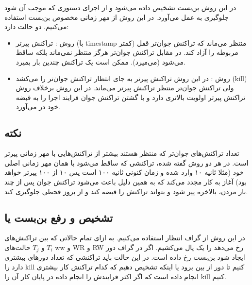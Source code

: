 در این روش بن‌بست تشخیص داده می‌شود و از اجرای دستوری که موجب آن شود جلوگیری به
عمل می‌آورد. در این روش از مهر زمانی مخصوص بن‌بست استفاده می‌کنیم. دو حالت دارد:

\begin{itemize}
    \item روش : تراکنش پیرتر (با timestamp کمتر) منتظر می‌ماند که
    تراکنش جوان‌تر قفل مربوطه را آزاد کند. در مقابل تراکنش جوان‌تر هرگز منتظر
    نمی‌ماند بلکه ساقط می‌شود (می‌میرد). ممکن است یک تراکنش چندین بار بمیرد.
    
    \item روش : در این روش تراکنش پیرتر به جای انتظار تراکنش
    جوان‌تر را می‌کشد (kill) ولی تراکنش جوان‌تر منتظر تراکنش پیرتر می‌ماند. در
    این روش برخلاف روش  تراکنش پیرتر اولویت بالاتری دارد و با گشتن
    تراکنش جوان فرایند اجرا را به قبضه خود در می‌آورد.
\end{itemize}

\subsection*{نکته}

تعداد تراکنش‌های جوان‌تر که منتظر هستند بیشتر از تراکنش‌هایی با مهر زمانی پیرتر
است. در هر دو روش گفته شده، تراکنشی که ساقط می‌شود با همان مهر زمانی اصلی خود
(مثلا ثانیه ۱۰ وارد شده و زمان کنونی ثانیه ۱۰۰ است پس ۱۰ از ۱۰۰ پیرتر خواهد بود)
آغاز به کار مجدد می‌کند که به همین دلیل باعث می‌شود تراکنش جوان پس از چند بار
مردن، بالاخره پیر شود و بتواند تراکنش را قبضه کند و از بروز قحطی جلوگیری کند.

\subsection{تشخیص و رفع بن‌بست یا }

در این روش از گراف انتظار استفاده می‌کنیم. به ازای تمام حالاتی‌ که بین
تراکنش‌های $T_i$ و $T_j$ حالت‌های ww و WR و RW رخ می‌دهد را یک یال می‌کشیم. اگر
در گراف دور ایجاد شود بن‌بست رخ داده است. در این حالت باید تراکنشی که تعداد
دور‌های بیشتری دارد را kill کنیم تا دور از بین برود یا اینکه تشخیص دهیم که کدام
تراکنش کار بیشتری انجام داده است که اگر اکثر فرایندش را انجام داده در پایان کار
آن را kill کنیم.

\newpage